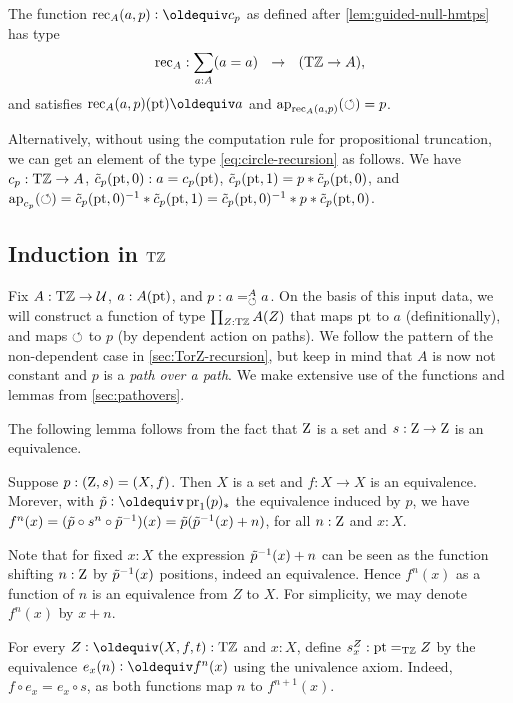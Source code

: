 \documentclass[a4paper,12pt]{amsart}
\begin{document}
\begin{definition}\label{def:TorZrecursor}
  The function ${\rec}_A(a,p) \defeq c_p$ as defined after
  \cref{lem:guided-null-hmtps} has type
  \[
    {\mathop{\mathrm{rec}}}_A : \sum_{a:A}(a=a) ~~\to~~ ({\mathrm{T}\mathbb{Z}} \to A),
  \]
  and satisfies ${\rec}_A(a,p)(\pt) \jdeq a$ and
  $\mathop{{\mathrm{ap}}_{{\mathop{\mathrm{rec}}}_A(a,p)}}({\circlearrowleft}) = p$.
\end{definition}

Alternatively, without using the computation rule for propositional truncation,
we can get an element of the type \cref{eq:circle-recursion} as follows.
We have $c_p : {\mathrm{T}\mathbb{Z}}\to A$,
$\tilde c_p({\mathord{\mathrm{pt}}},0) : a = c_p({\mathord{\mathrm{pt}}})$,
$\tilde c_p({\mathord{\mathrm{pt}}},1) = p * \tilde c_p({\mathord{\mathrm{pt}}},0)$, and
$\mathop{{\mathrm{ap}}_{c_p}}({\circlearrowleft}) = \tilde c_p({\mathord{\mathrm{pt}}},0)^{-1}* \tilde c_p({\mathord{\mathrm{pt}}},1)
= \tilde c_p({\mathord{\mathrm{pt}}},0)^{-1}* p * \tilde c_p({\mathord{\mathrm{pt}}},0)$.

\subsection{Induction in ${\mathrm{T}\mathbb{Z}}$}\label{sec:TorZ-induction}

Fix $A:{\mathrm{T}\mathbb{Z}}\to\mathcal{U}$, $a:A({\mathord{\mathrm{pt}}})$, and $p: a=^A_{{\circlearrowleft}} a$.
On the basis of this input data, we will construct a function of
type $\prod_{Z:{\mathrm{T}\mathbb{Z}}} A(Z)$ that maps ${\mathord{\mathrm{pt}}}$ to $a$ (definitionally),
and maps ${\circlearrowleft}$ to $p$ (by dependent action on paths).
We follow the pattern of the non-dependent case
in \cref{sec:TorZ-recursion}, but keep in mind that
$A$ is now not constant and $p$ is a \emph{path over a path}.
{We make extensive use of the functions and lemmas from \cref{sec:pathovers}.}

The following lemma follows from the fact that $\mathrm{Z}$ is a set
and $s: \mathrm{Z}\to\mathrm{Z}$ is an equivalence.

\begin{lemma}\label{lem:paths-in-TorZ}
  Suppose $p : (\mathrm{Z},s)=(X,f)$.  Then $X$ is a set and $f: X\to X$ is an equivalence.
  Morever, with $\ptoe{p}\defeq \pr_1(p)_*$ the equivalence induced by $p$, we have
  $f^n(x) = (\tilde {p}\circ s^n \circ \tilde {p}^{-1})(x) = \tilde {p}(\tilde {p}^{-1}(x)+n)$,
  for all $n:\mathrm{Z}$ and $x:X$.
\end{lemma}

Note that for fixed $x:X$ the expression $\tilde {p}^{-1}(x)+n$ can be seen as
the function shifting $n:\mathrm{Z}$ by $\tilde {p}^{-1}(x)$ positions, indeed an equivalence.
Hence $f^n(x)$ as a function of $n$ is an equivalence from $Z$ to $X$.
For simplicity, we may denote $f^n(x)$ by $x+n$.

\begin{definition}\label{def:loop-s-iterated}
  For every $Z\defeq(X,f,t):\TorZ$ and $x:X$,
  define $s^Z_x: {\mathord{\mathrm{pt}}} =_{\mathrm{T}\mathbb{Z}} Z$ by the equivalence
  $e_x(n)\defeq f^n(x)$ using the univalence axiom. Indeed,
  $f\circ e_x = e_x \circ s$, as both functions map $n$ to $f^{n+1}(x)$.
\end{definition}
\end{document}

